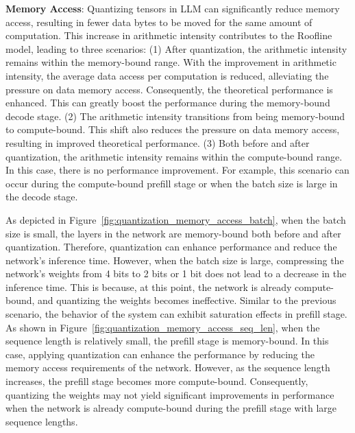 \textbf{Memory Access}: Quantizing tensors in LLM can significantly reduce memory access, resulting in fewer data bytes to be moved for the same amount of computation. This increase in arithmetic intensity contributes to the Roofline model, leading to three scenarios:
(1) After quantization, the arithmetic intensity remains within the memory-bound range. With the improvement in arithmetic intensity, the average data access per computation is reduced, alleviating the pressure on data memory access. Consequently, the theoretical performance is enhanced. This can greatly boost the performance during the memory-bound decode stage.
(2) The arithmetic intensity transitions from being memory-bound to compute-bound. This shift also reduces the pressure on data memory access, resulting in improved theoretical performance.
(3) Both before and after quantization, the arithmetic intensity remains within the compute-bound range. In this case, there is no performance improvement. For example, this scenario can occur during the compute-bound prefill stage or when the batch size is large in the decode stage.

As depicted in Figure~\ref{fig:quantization_memory_access_batch}, when the batch size is small, the layers in the network are memory-bound both before and after quantization. Therefore, quantization can enhance performance and reduce the network's inference time. However, when the batch size is large, compressing the network's weights from 4 bits to 2 bits or 1 bit does not lead to a decrease in the inference time. This is because, at this point, the network is already compute-bound, and quantizing the weights becomes ineffective.
Similar to the previous scenario, the behavior of the system can exhibit saturation effects in prefill stage. As shown in Figure~\ref{fig:quantization_memory_access_seq_len}, when the sequence length is relatively small, the prefill stage is memory-bound. In this case, applying quantization can enhance the performance by reducing the memory access requirements of the network.
However, as the sequence length increases, the prefill stage becomes more compute-bound. Consequently, quantizing the weights may not yield significant improvements in performance when the network is already compute-bound during the prefill stage with large sequence lengths.


